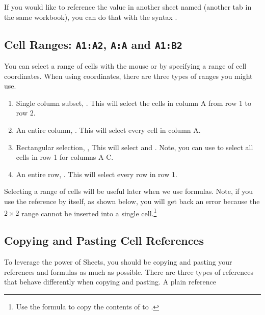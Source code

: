 If you would like to reference the value in another sheet named  (another tab in the same workbook), you can do that with the syntax . 


\subsection{Cell Ranges: \texttt{A1:A2}, \texttt{A:A} and \texttt{A1:B2}}

You can select a range of cells with the mouse or by specifying a range of cell coordinates. When using coordinates, there are three types of ranges you might use. 

\begin{enumerate}
    \item Single column subset, . This will select the cells in column A from row 1 to row 2.
    \item An entire column, . This will select every cell in column A. 
    \item Rectangular selection, , This will select  and . Note, you can use  to select all cells in row 1 for columns A-C.
    \item An entire row, . This will select every row in row 1. 
\end{enumerate}

Selecting a range of cells will be useful later when we use formulas. Note, if you use the reference  by itself, as shown below, you will get back an error because the $2\times 2$ range cannot be inserted into a single cell.\footnote{Use the formula  to copy the contents of  to .}
\begin{center}
\end{center}

\subsection{Copying and Pasting Cell References}

To leverage the power of Sheets, you should be copying and pasting your references and formulas as much as possible. There are three types of references that behave differently when copying and pasting. A plain  reference 

